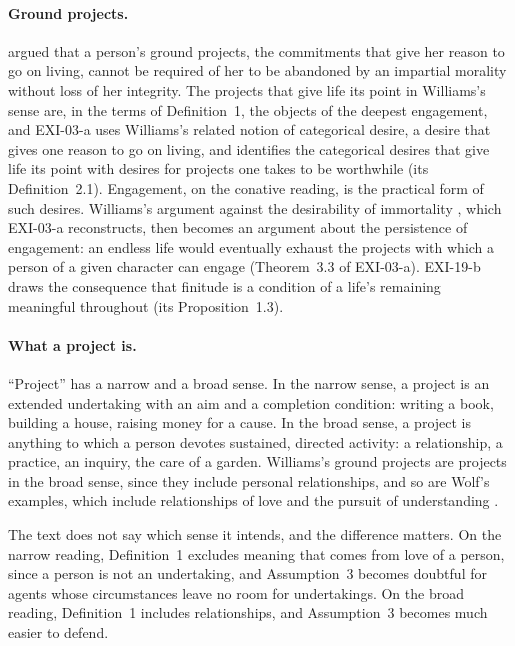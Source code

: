 \paragraph{Ground projects.} \citet{Williams1981a} argued that a person's ground projects, the commitments that give her reason to go on living, cannot be required of her to be abandoned by an impartial morality without loss of her integrity. The projects that give life its point in Williams's sense are, in the terms of Definition~1, the objects of the deepest engagement, and EXI-03-a uses Williams's related notion of categorical desire, a desire that gives one reason to go on living, and identifies the categorical desires that give life its point with desires for projects one takes to be worthwhile (its Definition~2.1). Engagement, on the conative reading, is the practical form of such desires. Williams's argument against the desirability of immortality \citep{Williams1973}, which EXI-03-a reconstructs, then becomes an argument about the persistence of engagement: an endless life would eventually exhaust the projects with which a person of a given character can engage (Theorem~3.3 of EXI-03-a). EXI-19-b draws the consequence that finitude is a condition of a life's remaining meaningful throughout (its Proposition~1.3).


\paragraph{What a project is.} \enquote{Project} has a narrow and a broad sense. In the narrow sense, a project is an extended undertaking with an aim and a completion condition: writing a book, building a house, raising money for a cause. In the broad sense, a project is anything to which a person devotes sustained, directed activity: a relationship, a practice, an inquiry, the care of a garden. Williams's ground projects are projects in the broad sense, since they include personal relationships, and so are Wolf's examples, which include relationships of love and the pursuit of understanding \citep{Wolf2010}.

The text does not say which sense it intends, and the difference matters. On the narrow reading, Definition~1 excludes meaning that comes from love of a person, since a person is not an undertaking, and Assumption~3 becomes doubtful for agents whose circumstances leave no room for undertakings. On the broad reading, Definition~1 includes relationships, and Assumption~3 becomes much easier to defend.

